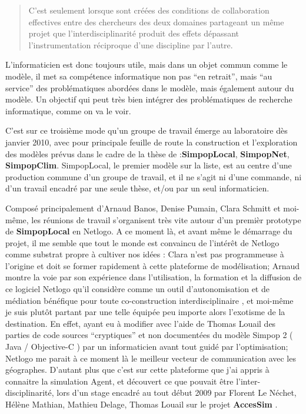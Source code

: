 \blockquote[\cite{Pumain2014}]{C’est seulement lorsque sont créées des conditions de collaboration effectives entre des chercheurs des deux domaines partageant un même projet que l’interdisciplinarité produit des effets dépassant l’instrumentation réciproque d’une discipline par l’autre.} 

L'informaticien est donc toujours utile, mais dans un objet commun comme le modèle, il met sa compétence informatique non pas \enquote{en retrait}, mais \enquote{au service} des problématiques abordées dans le modèle, mais également autour du modèle. Un objectif qui peut très bien intégrer des problématiques de recherche informatique, comme on va le voir.



C'est sur ce troisième mode qu'un groupe de travail émerge au laboratoire dès janvier 2010, avec pour principale feuille de route la construction et l'exploration des modèles prévus dans le cadre de la thèse de \textcite{Schmitt2014} :\textbf{SimpopLocal}, \textbf{SimpopNet}, \textbf{SimpopClim}. SimpopLocal, le premier modèle sur la liste, est au centre d'une production commune d'un groupe de travail, et il ne s'agit ni d'une commande, ni d'un travail encadré par une seule thèse, et/ou par un seul informaticien.

Composé principalement d'Arnaud Banos, Denise Pumain, Clara Schmitt et moi-même, les réunions de travail s'organisent très vite autour d'un premièr prototype de \textbf{SimpopLocal} en Netlogo. A ce moment là, et avant même le démarrage du projet, il me semble que tout le monde est convaincu de l'intérêt de Netlogo comme substrat propre à cultiver nos idées : Clara n'est pas programmeuse à l'origine et doit se former rapidement à cette plateforme de modélisation; Arnaud montre la voie par son expérience dans l'utilisation, la formation et la diffusion de ce logiciel Netlogo qu'il considère comme un outil d'autonomisation et de médiation bénéfique pour toute co-construction interdisciplinaire \autocite{Banos2013}, et moi-même je suis plutôt partant par une telle équipée peu importe alors l'exotisme de la destination. En effet, ayant eu à modifier avec l'aide de Thomas Louail des parties de code sources \enquote{cryptiques} et non documentées du modèle Simpop 2 ( Java / Objective-C )  par un informaticien avant tout guidé par l'optimisation; Netlogo me parait à ce moment là le meilleur vecteur de communication avec les géographes. D'autant plus que c'est sur cette plateforme que j'ai appris à connaitre la simulation Agent, et découvert ce que pouvait être l'inter-disciplinarité, lors d'un stage encadré au tout début 2009 par Florent Le Néchet, Hélène Mathian, Mathieu Delage, Thomas Louail sur le projet \textbf{AccesSim} \autocite{Delage2010}.

